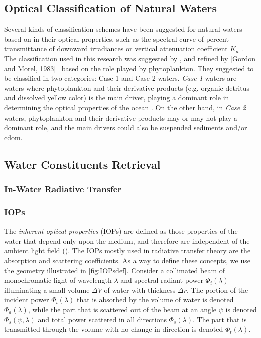 \subsection{Optical Classification of Natural Waters}

Several kinds of classification schemes have been suggested for natural waters based on in their optical properties, such as the spectral curve of percent transmittance of downward irradiances or vertical attenuation coefficient $K_d$ \cite{Kirk1983}. The classification used in this research was suggested by \cite{Morel:1977rw}, and refined by [Gordon and Morel, 1983]~ based on the role played by phytoplankton. They suggested to be classified in two categories: Case 1 and Case 2 waters. {\it Case 1} waters are waters where phytoplankton and their derivative products (e.g. organic detritus and dissolved yellow color) is the main driver, playing a dominant role in determining the optical properties of the ocean \cite{Kirk1983}. On the other hand, in {\it Case 2} waters, phytoplankton and their derivative products may or may not play a dominant role, and the main drivers could also be suspended sediments and/or \gls{cdom}.


\subsection{Water Constituents Retrieval}
\subsubsection{In-Water Radiative Transfer}
\subsubsection*{IOPs}
The {\it inherent optical properties} (IOPs) are defined as those properties of the water that depend only upon the medium, and therefore are independent of the ambient light field (\cite{Mobley:2001}). The IOPs mostly used in radiative transfer theory are the absorption and scattering coefficients. As a way to define these concepts, we use the geometry illustrated in \autoref{fig:IOPsdef}. Consider a collimated beam of monochromatic light of wavelength $\lambda$ and spectral radiant power $\Phi_i(\lambda)$ illuminating a small volume $\Delta V$ of water with thickness $\Delta r$. The portion of the incident power $\Phi_i(\lambda)$ that is absorbed by the volume of water is denoted $\Phi_a(\lambda)$, while the part that is scattered out of the beam at an angle $\psi$ is denoted $\Phi_s(\psi,\lambda)$ and total power scattered in all directions $\Phi_s(\lambda)$. The part that is transmitted through the volume with no change in direction is denoted $\Phi_t(\lambda)$. 

